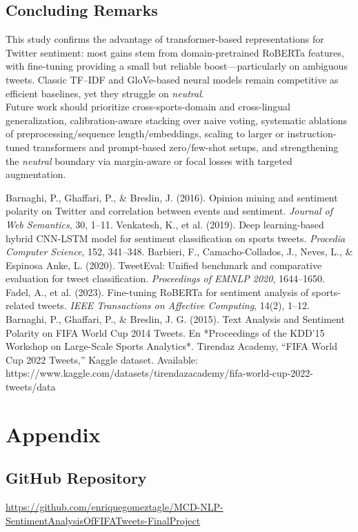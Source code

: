 \documentclass[10pt]{article}
\begin{document}
\subsection{Concluding Remarks}
This study confirms the advantage of transformer-based representations for Twitter sentiment: most gains stem from domain-pretrained RoBERTa features, with fine-tuning providing a small but reliable boost—particularly on ambiguous tweets. Classic TF--IDF and GloVe-based neural models remain competitive as efficient baselines, yet they struggle on \emph{neutral}.\\
Future work should prioritize cross-sports-domain and cross-lingual generalization, calibration-aware stacking over naive voting, systematic ablations of preprocessing/sequence length/embeddings, scaling to larger or instruction-tuned transformers and prompt-based zero/few-shot setups, and strengthening the \emph{neutral} boundary via margin-aware or focal losses with targeted augmentation.
\begin{thebibliography}{9}
 Barnaghi, P., Ghaffari, P., \& Breslin, J. (2016). Opinion mining and sentiment polarity on Twitter and correlation between events and sentiment. \textit{Journal of Web Semantics}, 30, 1–11.
 Venkatesh, K., et al. (2019). Deep learning-based hybrid CNN-LSTM model for sentiment classification on sports tweets. \textit{Procedia Computer Science}, 152, 341–348.
 Barbieri, F., Camacho-Collados, J., Neves, L., \& Espinosa Anke, L. (2020). TweetEval: Unified benchmark and comparative evaluation for tweet classification. \textit{Proceedings of EMNLP 2020}, 1644–1650.
 Fadel, A., et al. (2023). Fine-tuning RoBERTa for sentiment analysis of sports-related tweets. \textit{IEEE Transactions on Affective Computing}, 14(2), 1–12.
 Barnaghi, P., Ghaffari, P., \& Breslin, J. G. (2015). Text Analysis and Sentiment Polarity on FIFA World Cup 2014 Tweets. En *Proceedings of the KDD’15 Workshop on Large-Scale Sports Analytics*.  
 Tirendaz Academy, “FIFA World Cup 2022 Tweets,” Kaggle dataset. Available: https://www.kaggle.com/datasets/tirendazacademy/fifa-world-cup-2022-tweets/data
\end{thebibliography}
\section{Appendix}
\subsection{GitHub Repository}
\url{https://github.com/enriquegomeztagle/MCD-NLP-SentimentAnalysisOfFIFATweets-FinalProject}
\end{document}
